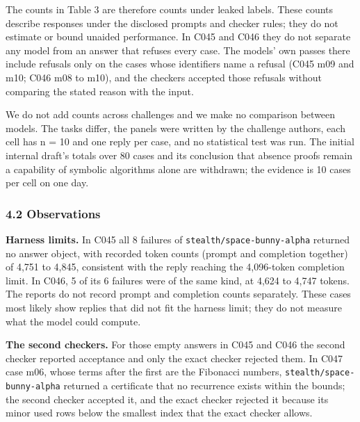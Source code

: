 \documentclass[
  11pt,
]{article}
\begin{document}
The counts in Table 3 are therefore counts under leaked labels. These
counts describe responses under the disclosed prompts and checker rules;
they do not estimate or bound unaided performance. In C045 and C046 they
do not separate any model from an answer that refuses every case. The
models' own passes there include refusals only on the cases whose
identifiers name a refusal (C045 m09 and m10; C046 m08 to m10), and the
checkers accepted those refusals without comparing the stated reason
with the input.

We do not add counts across challenges and we make no comparison between
models. The tasks differ, the panels were written by the challenge
authors, each cell has n = 10 and one reply per case, and no statistical
test was run. The initial internal draft's totals over 80 cases and its
conclusion that absence proofs remain a capability of symbolic
algorithms alone are withdrawn; the evidence is 10 cases per cell on one
day.

\hypertarget{observations}{%
\subsubsection{4.2 Observations}\label{observations}}

\textbf{Harness limits.} In C045 all 8 failures of
\texttt{stealth/\allowbreak{}space-\allowbreak{}bunny-\allowbreak{}alpha}
returned no answer object, with recorded token counts (prompt and
completion together) of 4,751 to 4,845, consistent with the reply
reaching the 4,096-token completion limit. In C046, 5 of its 6 failures
were of the same kind, at 4,624 to 4,747 tokens. The reports do not
record prompt and completion counts separately. These cases most likely
show replies that did not fit the harness limit; they do not measure
what the model could compute.

\textbf{The second checkers.} For those empty answers in C045 and C046
the second checker reported acceptance and only the exact checker
rejected them. In C047 case m06, whose terms after the first are the
Fibonacci numbers,
\texttt{stealth/\allowbreak{}space-\allowbreak{}bunny-\allowbreak{}alpha}
returned a certificate that no recurrence exists within the bounds; the
second checker accepted it, and the exact checker rejected it because
its minor used rows below the smallest index that the exact checker
allows.
\end{document}
